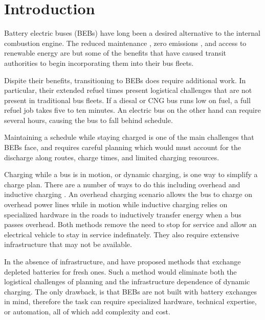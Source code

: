 \section{Introduction}
\par  Battery electric buses (BEBs) have long been a desired alternative to the internal combustion engine. The reduced maintenance \cite{poornesh_comparative_2020}, zero emissions \cite{kato_comparative_2013}, and access to renewable energy \cite{cheng_smart_2020} are but some of the benefits that have caused transit authorities to begin incorporating them into their bus fleets.  
\par Dispite their benefits, transitioning to BEBs does require additional work. In particular, their extended refuel times present logistical challenges that are not present in traditional bus fleets. If a diesal or CNG bus runs low on fuel, a full refuel job takes five to ten minutes.  An electric bus on the other hand can require several hours, causing the bus to fall behind schedule.
\par Maintaining a schedule while staying charged is one of the main challenges that BEBs face, and requires careful planning which would must account for the discharge along routes, charge times, and limited charging resources. 
\par Charging while a bus is in motion, or dynamic charging, is one way to simplify a charge plan. There are a number of ways to do this including overhead \cite{csonka_optimization_2021} and inductive charging\cite{jeong_automatic_2018} \cite{balde_electric_2019}. An overhead charging scenario allows the bus to charge on overhead power lines while in motion while inductive charging relies on specialized hardware in the roads to inductively transfer energy when a bus passes overhead. Both methods remove the need to stop for service and allow an electrical vehicle to stay in service indefinately. They also require extensive infrastructure that may not be available.
\par In the absence of infrastructure, \cite{jain_battery_2020} and \cite{xian_zhang_optimal_2016} have proposed methods that exchange depleted batteries for fresh ones. Such a method would eliminate both the logistical challenges of planning and the infrastructure dependence of dynamic charging. The only drawback, is that BEBs are not built with battery exchanges in mind, therefore the task can require specialized hardware, technical expertise, or automation, all of which add complexity and cost.


